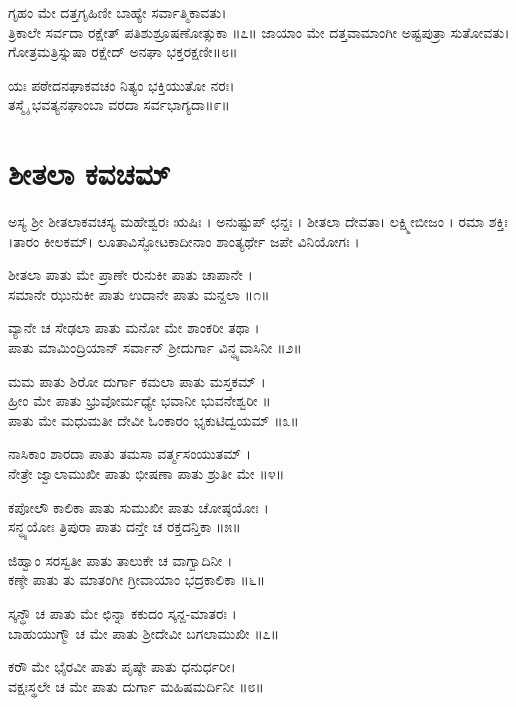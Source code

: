 ಗೃಹಂ ಮೇ ದತ್ತಗೃಹಿಣೀ ಬಾಹ್ಯೇ ಸರ್ವಾತ್ಮಿಕಾವತು।\\
ತ್ರಿಕಾಲೇ ಸರ್ವದಾ ರಕ್ಷೇತ್ ಪತಿಶುಶ್ರೂಷಣೋತ್ಸುಕಾ ॥೭॥
\newpage
ಜಾಯಾಂ ಮೇ ದತ್ತವಾಮಾಂಗೀ ಅಷ್ಟಪುತ್ರಾ ಸುತೋವತು।\\
ಗೋತ್ರಮತ್ರಿಸ್ನುಷಾ ರಕ್ಷೇದ್ ಅನಘಾ ಭಕ್ತರಕ್ಷಣೀ॥೮॥

ಯಃ ಪಠೇದನಘಾಕವಚಂ ನಿತ್ಯಂ ಭಕ್ತಿಯುತೋ ನರಃ।\\
ತಸ್ಮೈ ಭವತ್ಯನಘಾಂಬಾ ವರದಾ ಸರ್ವಭಾಗ್ಯದಾ॥೯॥

\section{ಶೀತಲಾ ಕವಚಮ್}
ಅಸ್ಯ ಶ್ರೀ ಶೀತಲಾಕವಚಸ್ಯ ಮಹೇಶ್ವರಃ ಋಷಿಃ । ಅನುಷ್ಟುಪ್ ಛನ್ದಃ ।
ಶೀತಲಾ ದೇವತಾ। ಲಕ್ಷ್ಮೀಬೀಜಂ । ರಮಾ ಶಕ್ತಿಃ ।ತಾರಂ ಕೀಲಕಮ್।
ಲೂತಾವಿಸ್ಫೋಟಕಾದೀನಾಂ ಶಾಂತ್ಯರ್ಥೇ ಜಪೇ ವಿನಿಯೋಗಃ ।


ಶೀತಲಾ ಪಾತು ಮೇ ಪ್ರಾಣೇ ರುನುಕೀ ಪಾತು ಚಾಪಾನೇ ।\\
ಸಮಾನೇ ಝುನುಕೀ ಪಾತು ಉದಾನೇ ಪಾತು ಮನ್ದಲಾ ॥೧॥

ವ್ಯಾನೇ ಚ ಸೇಢಲಾ ಪಾತು ಮನೋ ಮೇ ಶಾಂಕರೀ ತಥಾ ।\\
ಪಾತು ಮಾಮಿಂದ್ರಿಯಾನ್ ಸರ್ವಾನ್ ಶ್ರೀದುರ್ಗಾ ವಿನ್ಧ್ಯವಾಸಿನೀ ॥೨॥

ಮಮ ಪಾತು ಶಿರೋ ದುರ್ಗಾ ಕಮಲಾ ಪಾತು ಮಸ್ತಕಮ್ ।\\
ಹ್ರೀಂ ಮೇ ಪಾತು ಭ್ರುವೋರ್ಮಧ್ಯೇ ಭವಾನೀ ಭುವನೇಶ್ವರೀ ॥\\
ಪಾತು ಮೇ ಮಧುಮತೀ ದೇವೀ ಓಂಕಾರಂ ಭೃಕುಟಿದ್ವಯಮ್ ॥೩॥

ನಾಸಿಕಾಂ ಶಾರದಾ ಪಾತು ತಮಸಾ ವರ್ತ್ಮಸಂಯುತಮ್ ।\\
ನೇತ್ರೇ ಜ್ವಾಲಾಮುಖೀ ಪಾತು ಭೀಷಣಾ ಪಾತು ಶ್ರುತೀ ಮೇ ॥೪॥

ಕಪೋಲೌ ಕಾಲಿಕಾ ಪಾತು ಸುಮುಖೀ ಪಾತು ಚೋಷ್ಠಯೋಃ ।\\
ಸನ್ಧ್ಯಯೋಃ ತ್ರಿಪುರಾ ಪಾತು ದನ್ತೇ ಚ ರಕ್ತದನ್ತಿಕಾ ॥೫॥

ಜಿಹ್ವಾಂ ಸರಸ್ವತೀ ಪಾತು ತಾಲುಕೇ ಚ ವಾಗ್ವಾದಿನೀ ।\\
ಕಣ್ಠೇ ಪಾತು ತು ಮಾತಂಗೀ ಗ್ರೀವಾಯಾಂ ಭದ್ರಕಾಲಿಕಾ ॥೬॥

ಸ್ಕನ್ಧೌ ಚ ಪಾತು ಮೇ ಛಿನ್ನಾ ಕಕುದಂ ಸ್ಕನ್ದ-ಮಾತರಃ ।\\
ಬಾಹುಯುಗ್ಮೌ ಚ ಮೇ ಪಾತು ಶ್ರೀದೇವೀ ಬಗಲಾಮುಖೀ ॥೭॥

ಕರೌ ಮೇ ಭೈರವೀ ಪಾತು ಪೃಷ್ಠೇ ಪಾತು ಧನುರ್ಧರೀ।\\
ವಕ್ಷಃಸ್ಥಲೇ ಚ ಮೇ ಪಾತು ದುರ್ಗಾ ಮಹಿಷಮರ್ದಿನೀ ॥೮॥

